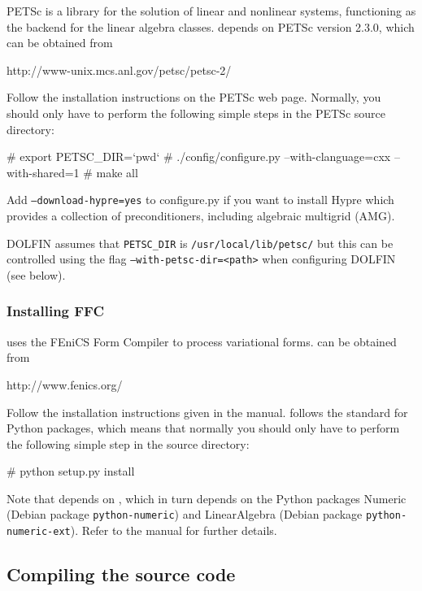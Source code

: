 PETSc is a library for the solution of linear and nonlinear systems, functioning as the backend
for the \dolfin{} linear algebra classes. \dolfin{} depends on PETSc version 2.3.0, which can be
obtained from
\begin{code}
  http://www-unix.mcs.anl.gov/petsc/petsc-2/
\end{code}

Follow the installation instructions on the PETSc web page. Normally,
you should only have to perform the following simple steps in the PETSc
source directory:
\begin{code}
  # export PETSC_DIR=`pwd`
  # ./config/configure.py --with-clanguage=cxx --with-shared=1
  # make all
\end{code}

Add \texttt{--download-hypre=yes} to configure.py if you want to
install Hypre which provides a collection of preconditioners,
including algebraic multigrid (AMG).

DOLFIN assumes that \texttt{PETSC\_DIR} is
\texttt{/usr/local/lib/petsc/} but this can be controlled using the
flag \texttt{--with-petsc-dir=<path>} when configuring DOLFIN (see
below).

\subsubsection{Installing FFC}

\dolfin{} uses the FEniCS Form Compiler \ffc{} to process variational
forms. \ffc{} can be obtained from
\begin{code}
  http://www.fenics.org/
\end{code}

Follow the installation instructions given in the \ffc{}
manual. \ffc{} follows the standard for Python packages, which means
that normally you should only have to perform the following simple step
in the \ffc{} source directory:
\begin{code}
  # python setup.py install
\end{code}

Note that \ffc{} depends on \fiat{} , which in turn depends on
the Python packages Numeric (Debian package \texttt{python-numeric}) and
LinearAlgebra (Debian package \texttt{python-numeric-ext}). Refer to
the \ffc{} manual for further details.



\subsection{Compiling the source code}


